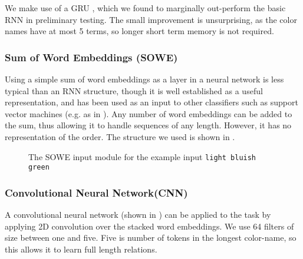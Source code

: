 \documentclass[]{clv3}
\newcommand{\parencite}{\citep}
\newcommand{\textcite}{\citet}
\newcommand{\natlang}[1]{\texttt{#1}}
\begin{document}
We make use of a GRU \parencite{cho2014properties},
which we found to marginally out-perform the basic RNN in preliminary testing.
The small improvement is unsurprising, as the color names have at most 5 terms,
so longer short term memory is not required.


\subsubsection{Sum of Word Embeddings (SOWE)}\label{sec:sowemod}
Using a simple sum of word embeddings as a layer in a neural network is less typical than an RNN structure,
though it is well established as a useful representation, and has been used as an input to other classifiers such as support vector machines (e.g. as in \textcite{White2015SentVecMeaning,novelperspective}).
Any number of word embeddings can be added to the sum, thus allowing it to handle sequences of any length.
However, it has no representation of the order.
The structure we used is shown in .

\begin{figure}
	
	\caption{The SOWE input module for the example input \natlang{light bluish green}}
	\label{fig:sowemod}
\end{figure}



\subsubsection{Convolutional Neural Network(CNN)}\label{sec:cnnmod}
A convolutional neural network (shown in ) can be applied to the task by applying 2D convolution over the stacked word embeddings.
We use 64 filters of size between one and five.
Five is number of tokens in the longest color-name,
so this allows it to learn full length relations.
\end{document}
